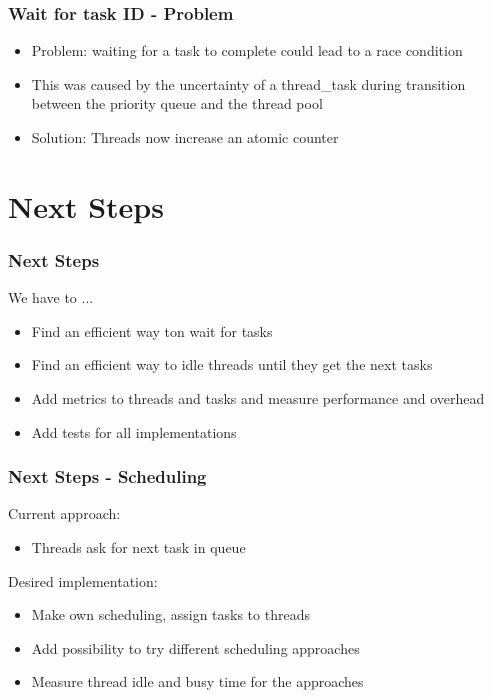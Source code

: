 \documentclass{beamer}
\begin{document}
\begin{frame}
	\frametitle{Wait for task ID - Problem}
	\begin{itemize}
		\item Problem: waiting for a task to complete could lead to a
			race condition
		\item This was caused by the uncertainty of a thread\_task
			during transition between the priority queue and the
			thread pool
		\item Solution: Threads now increase an atomic counter
	\end{itemize}
\end{frame}

\section{Next Steps}
\begin{frame}
	\frametitle{Next Steps}
	We have to ...
	\begin{itemize}
		\item Find an efficient way ton wait for tasks
		\item Find an efficient way to idle threads until they get the next tasks
		\item Add metrics to threads and tasks and measure performance and overhead
		\item Add tests for all implementations
	\end{itemize}
\end{frame}

\begin{frame}
	\frametitle{Next Steps - Scheduling}
	Current approach:  
	\begin{itemize}
		\item Threads ask for next task in queue
	\end{itemize}
	Desired implementation: 
	\begin{itemize}
		\item Make own scheduling, assign tasks to threads
		\item Add possibility to try different scheduling approaches
		\item Measure thread idle and busy time for the approaches
	\end{itemize}
\end{frame}
\end{document}
